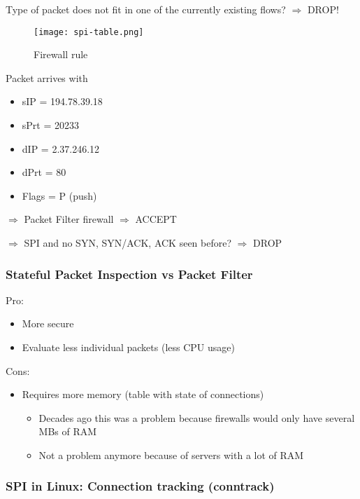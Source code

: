 \documentclass{article}
\begin{document}
Type of packet does not fit in one of the currently existing flows? $\Rightarrow$ DROP!

\begin{figure}[H]
    \centering
    \texttt{[image: spi-table.png]}
    \caption{Firewall rule}
\end{figure}

Packet arrives with

\begin{itemize}
    \item sIP = 194.78.39.18
    \item sPrt = 20233
    \item dIP = 2.37.246.12
    \item dPrt = 80
    \item Flags = P (push)
\end{itemize}


$\Rightarrow$ Packet Filter firewall $\Rightarrow$ ACCEPT

$\Rightarrow$ SPI and no SYN, SYN/ACK, ACK seen before? $\Rightarrow$ DROP


\subsubsection{Stateful Packet Inspection vs Packet Filter}

Pro:

\begin{itemize}
    \item More secure
    \item Evaluate less individual packets (less CPU usage)
\end{itemize}

Cons:

\begin{itemize}
    \item Requires more memory (table with state of connections)
    \begin{itemize}
        \item Decades ago this was a problem because firewalls would only have several MBs of RAM
        \item Not a problem anymore because of servers with a lot of RAM
    \end{itemize}
\end{itemize}

\subsubsection{SPI in Linux: Connection tracking (conntrack)}
\end{document}
